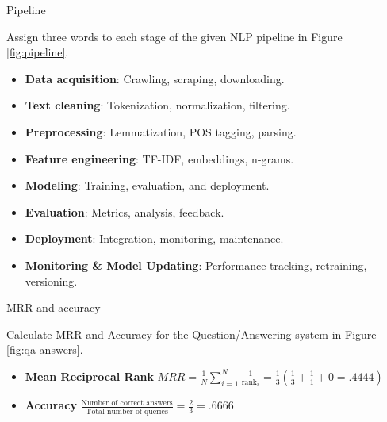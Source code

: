 \documentclass{article}
\begin{document}
\begin{exercise}{Pipeline}
  
  Assign three words to each stage of the given NLP pipeline in Figure \ref{fig:pipeline}.

  \begin{solution}
    \begin{itemize}
      \item \textbf{Data acquisition}: Crawling, scraping, downloading.
      \item \textbf{Text cleaning}: Tokenization, normalization, filtering.
      \item \textbf{Preprocessing}: Lemmatization, POS tagging, parsing.
      \item \textbf{Feature engineering}: TF-IDF, embeddings, n-grams.
      \item \textbf{Modeling}: Training, evaluation, and deployment.
      \item \textbf{Evaluation}: Metrics, analysis, feedback.
      \item \textbf{Deployment}: Integration, monitoring, maintenance.
      \item \textbf{Monitoring \& Model Updating}: Performance tracking, retraining, versioning.
    \end{itemize}
  \end{solution}
\end{exercise}

\begin{exercise}{MRR and accuracy}
  
  Calculate MRR and Accuracy for the Question/Answering system in Figure \ref{fig:qa-answers}.

  \begin{solution}
    \begin{itemize}
        \item \textbf{Mean Reciprocal Rank} $MRR = \frac{1}{N} \sum_{i=1}^{N} \frac{1}{\text{rank}_i} = \frac{1}{3} (\frac{1}{3}+\frac{1}{1}+0 = .4444)$
        \item \textbf{Accuracy} $\frac{\text{Number of correct answers}}{\text{Total number of queries}} = \frac{2}{3} = .6666$
    \end{itemize}
  \end{solution}
\end{exercise}
\end{document}
